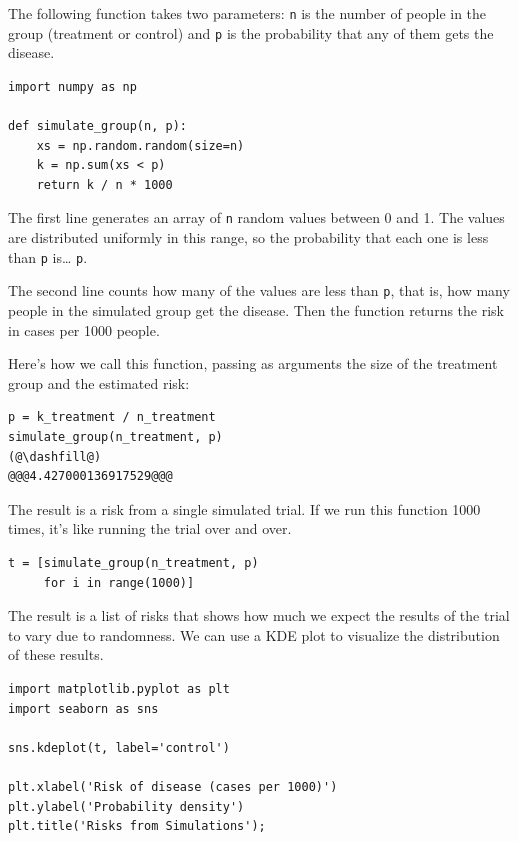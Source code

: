 The following function takes two parameters: \passthrough{\lstinline!n!}
is the number of people in the group (treatment or control) and
\passthrough{\lstinline!p!} is the probability that any of them gets the
disease.

\begin{lstlisting}[]
import numpy as np

def simulate_group(n, p):
    xs = np.random.random(size=n)
    k = np.sum(xs < p)
    return k / n * 1000
\end{lstlisting}

The first line generates an array of \passthrough{\lstinline!n!} random
values between 0 and 1. The values are distributed uniformly in this
range, so the probability that each one is less than
\passthrough{\lstinline!p!} is\ldots{} \passthrough{\lstinline!p!}.

The second line counts how many of the values are less than
\passthrough{\lstinline!p!}, that is, how many people in the simulated
group get the disease. Then the function returns the risk in cases per
1000 people.

Here's how we call this function, passing as arguments the size of the
treatment group and the estimated risk:

\begin{lstlisting}[]
p = k_treatment / n_treatment
simulate_group(n_treatment, p)
(@\dashfill@)
@@@4.427000136917529@@@
\end{lstlisting}

The result is a risk from a single simulated trial. If we run this
function 1000 times, it's like running the trial over and over.

\begin{lstlisting}[]
t = [simulate_group(n_treatment, p)
     for i in range(1000)]
\end{lstlisting}

The result is a list of risks that shows how much we expect the results
of the trial to vary due to randomness. We can use a KDE plot to
visualize the distribution of these results.

\begin{lstlisting}[]
import matplotlib.pyplot as plt
import seaborn as sns

sns.kdeplot(t, label='control')

plt.xlabel('Risk of disease (cases per 1000)')
plt.ylabel('Probability density')
plt.title('Risks from Simulations');
\end{lstlisting}

